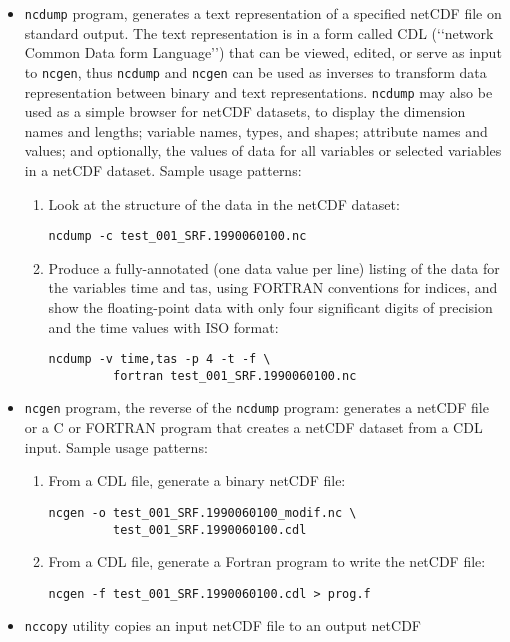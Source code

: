 \begin{itemize}
\item \verb=ncdump= program, generates a text representation of a specified
netCDF file on standard output. The text representation is in a form called
CDL (‘‘network Common Data form Language’’) that can be viewed, edited, or
serve as input to \verb=ncgen=, thus \verb=ncdump= and \verb=ncgen= can be
used as inverses to transform data representation between binary and text
representations. \verb=ncdump= may also be used as a simple browser for netCDF
datasets, to display the dimension names and lengths; variable names, types,
and shapes; attribute names and values; and optionally, the values of data
for all variables or selected variables in a netCDF dataset. 
Sample usage patterns:
\begin{enumerate}
\item Look at the structure of the data in the netCDF dataset:
\begin{Verbatim}
ncdump -c test_001_SRF.1990060100.nc
\end{Verbatim}
\item Produce a fully-annotated (one data value per line) listing of the data
for the variables time and tas, using FORTRAN conventions for indices, and show
the floating-point data with only four significant digits of precision and the
time values with ISO format:
\begin{Verbatim}
ncdump -v time,tas -p 4 -t -f \
         fortran test_001_SRF.1990060100.nc
\end{Verbatim}
\end{enumerate}
\item \verb=ncgen= program, the reverse of the \verb=ncdump= program: generates
a netCDF file or a C or FORTRAN program that creates a netCDF dataset from a
CDL input.
Sample usage patterns:
\begin{enumerate}
\item From a CDL file, generate a binary netCDF file:
\begin{Verbatim}
ncgen -o test_001_SRF.1990060100_modif.nc \
         test_001_SRF.1990060100.cdl
\end{Verbatim}
\item From a CDL file, generate a Fortran program to write the netCDF file:
\begin{Verbatim}
ncgen -f test_001_SRF.1990060100.cdl > prog.f
\end{Verbatim}
\end{enumerate}
\item \verb=nccopy= utility copies an input netCDF file to an output netCDF

\end{itemize}
